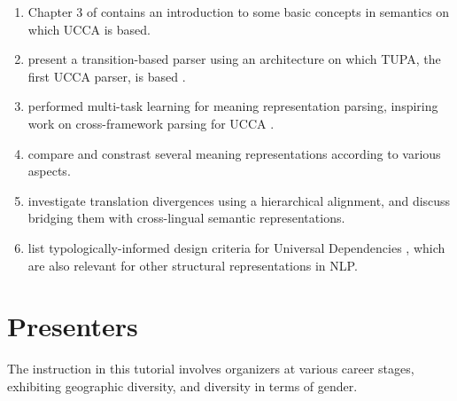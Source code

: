 \documentclass[11pt,a4paper,table]{article}
\begin{document}
\begin{enumerate}
    \item Chapter 3 of  contains an introduction
    to some basic concepts in semantics on which UCCA is based.
    \item {} present a
    transition-based parser using an architecture on which TUPA, the first
    UCCA parser, is based \cite{hershcovich2017a}.
    \item {} performed multi-task learning for
    meaning representation parsing, inspiring work on cross-framework
    parsing for UCCA \cite{hershcovich2018multitask}.
    \item {} compare and constrast several meaning
    representations according to various aspects.
    \item {} investigate translation divergences
    using a hierarchical alignment,
    and discuss bridging them with cross-lingual semantic representations.
    \item {} list typologically-informed design 
    criteria for Universal Dependencies \cite{11234/1-2988},
    which are also relevant for other structural representations in NLP.
\end{enumerate}

\section{Presenters}\label{sec:instructors}

The instruction in this tutorial involves organizers at various
career stages, exhibiting geographic diversity, and diversity in terms of 
gender.
\end{document}
